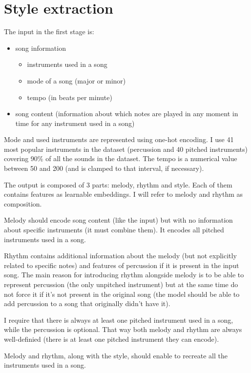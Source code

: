 \documentclass[en]{pracamgr}
\begin{document}
\section{Style extraction}

The input in the first stage is:
\begin{itemize}
    \item song information
    \begin{itemize}
        \item instruments used in a song
        \item mode of a song (major or minor)
        \item tempo (in beats per minute)
    \end{itemize}
    \item song content (information about which notes are played in any moment in time for any instrument used in a song)
\end{itemize}

Mode and used instruments are represented using one-hot encoding.
I use 41 most popular instruments in the dataset (percussion and 40 pitched instruments) covering 90\% of all the sounds in the dataset.
The tempo is a numerical value between 50 and 200 (and is clamped to that interval, if necessary).

The output is composed of 3 parts: melody, rhythm and style.
Each of them contains features as learnable embeddings.
I will refer to melody and rhythm as composition.

Melody should encode song content (like the input) but with no information about specific instruments (it must combine them).
It encodes all pitched instruments used in a song.

Rhythm contains additional information about the melody (but not explicitly related to specific notes) and features of percussion if it is present in the input song.
The main reason for introducing rhythm alongside melody is to be able to represent percussion (the only unpitched instrument) but at the same time do not force it if it's not present in the original song (the model should be able to add percussion to a song that originally didn't have it).

I require that there is always at least one pitched instrument used in a song, while the percussion is optional.
That way both melody and rhythm are always well-definied (there is at least one pitched instrument they can encode).

Melody and rhythm, along with the style, should enable to recreate all the instruments used in a song.
\end{document}

